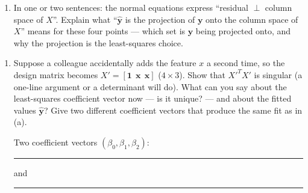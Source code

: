 \documentclass[
  11pt,
]{article}
\providecommand{\tightlist}{%
  \setlength{\itemsep}{0pt}\setlength{\parskip}{0pt}}
\newcommand{\answerspace}[1]{\par\vspace*{#1}}  %
\newcommand{\blank}[1][1.2in]{\rule{#1}{0.4pt}}
\begin{document}
\answerspace{2.5in}

\begin{enumerate}
\def\labelenumi{(\alph{enumi})}
\setcounter{enumi}{2}
\tightlist
\item
  In one or two sentences: the normal equations express ``residual
  \(\perp\) column space of \(X\)''. Explain what ``\(\hat{\mathbf y}\)
  is the projection of \(\mathbf y\) onto the column space of \(X\)''
  means for these four points --- which set is \(\mathbf y\) being
  projected onto, and why the projection is the least-squares choice.
\end{enumerate}

\answerspace{2.5in}

\begin{enumerate}
\def\labelenumi{(\alph{enumi})}
\setcounter{enumi}{3}
\item
  Suppose a colleague accidentally adds the feature \(x\) a second time,
  so the design matrix becomes
  \(X' = [\mathbf 1\ \ \mathbf x\ \ \mathbf x]\) (\(4\times3\)). Show
  that \(X'^TX'\) is singular (a one-line argument or a determinant will
  do). What can you say about the least-squares coefficient vector now
  --- is it unique? --- and about the fitted values \(\hat{\mathbf y}\)?
  Give two different coefficient vectors that produce the same fit as in
  (a).

  Two coefficient vectors \((\beta_0, \beta_1, \beta_2)\):
  \blank[1.5in] and \blank[1.5in]
\end{enumerate}

\answerspace{2.5in}
\end{document}
